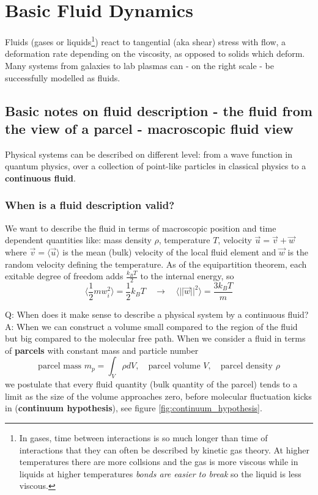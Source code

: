 \section{Basic Fluid Dynamics}
\thispagestyle{plain}

Fluids (gases or liquids\footnote{In gases, time between interactions is so much longer than
time of interactions that they can often be described by kinetic gas theory. At higher temperatures
there are more collsions and the gas is more viscous while in liquids at higher temperatures \textit{bonds are easier to break}
so the liquid is less viscous.}) react to tangential (aka shear) stress with flow, a deformation
rate depending on the viscosity, as opposed to solids which deform. Many systems from galaxies
to lab plasmas can - on the right scale - be successfully modelled as fluids.

\subsection{Basic notes on fluid description - the fluid from the view of a parcel - macroscopic fluid view}
Physical systems can be described on different level: from a wave function in quantum physics,
over a collection of point-like particles in classical physics to a \textbf{continuous fluid}.

\subsubsection{When is a fluid description valid?}
We want to describe the fluid in terms of macroscopic position and time dependent quantities like:
mass density $\rho$, temperature $T$, velocity $\vec{u} = \vec{v} + \vec{w}$ where $\vec{v} = \langle \vec{u} \rangle$
is the mean (bulk) velocity of the local fluid element and $\vec{w}$ is the random velocity defining the
temperature.
As of the equipartition theorem, each exitable degree of freedom adds $\frac{k_BT}{2}$ to the
internal energy, so
\begin{equation}
    \langle \frac{1}{2} m w_i^2 \rangle = \frac{1}{2} k_B T \quad \rightarrow \quad \langle ||\vec{w} ||^2 \rangle = \frac{3k_BT}{m}
\end{equation}

Q: When does it make sense to describe a physical system by a continuous fluid? A: When we can construct
a volume small compared to the region of the fluid but big compared to the molecular free path. When
we consider a fluid in terms of \textbf{parcels} with constant mass and particle number
\begin{equation}
    \text{parcel mass } m_p = \int_{V} \rho dV, \quad \text{parcel volume } V, \quad \text{parcel density } \rho
\end{equation}
we postulate that every fluid quantity (bulk quantity of the parcel) tends to a limit as the size of the volume
approaches zero, before molecular fluctuation kicks in (\textbf{continuum hypothesis}), see figure \ref{fig:continuum_hypothesis}.


